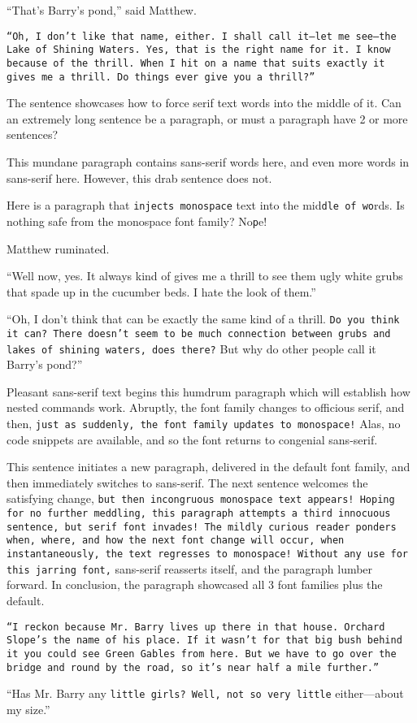 \documentclass[a4paper]{article}
\begin{document}
\textsf{``That's Barry's pond,'' said Matthew.}

\texttt{``Oh, I don't like that name, either. I shall call it---let me see---the Lake of Shining Waters. Yes, that is the right name for it. I know because of the thrill. When I hit on a name that suits exactly it gives me a thrill. Do things ever give you a thrill?''}

The sentence showcases \textrm{how to force serif text words} into the middle of it. Can an extremely long sentence be a paragraph, or must a paragraph have 2 or more sentences?

This mundane paragraph contains \textsf{sans-serif} words here, and even more \textsf{words in sans-serif here}. However, this drab sentence does not.

Here is a paragraph that \texttt{injects monospace} text into the mid\texttt{dle of wo}rds. Is nothing safe from the monospace font family? No\texttt{p}e!

Mat\textrm{thew rumin}ated.

``Well now, yes. \textsf{It always kind of gives me a thrill to see them ugly white grubs that spade up in the cucumber beds.} I hate the look of them.''

``Oh, I don't think that can be exactly the same kind of a thrill. \texttt{Do you think it can? There doesn't seem to be much connection between grubs and lakes of shining waters, does there?} But why do other people call it Barry's pond?''

\textsf{Pleasant sans-serif text begins this humdrum paragraph which will establish how nested commands work. \textrm{Abruptly, the font family changes to officious serif,} and then, \texttt{just as suddenly, the font family updates to monospace!} Alas, no code snippets are available, and so the font returns to congenial sans-serif.}

This sentence initiates a new paragraph, delivered in the default font family, \textsf{and then immediately switches to sans-serif. The next sentence welcomes the satisfying change, \texttt{but then incongruous monospace text appears! Hoping for no further meddling, this paragraph attempts a third innocuous sentence, \textrm{but serif font invades! The mildly curious reader ponders when, where, and how the next font change will occur,} when instantaneously, the text regresses to monospace! Without any use for this jarring font,} sans-serif reasserts itself, and the paragraph lumber forward. In conclusion, the paragraph showcased all 3 font families} plus the default.

\texttt{``I reckon because Mr. Barry lives up there in that house. \textrm{Orchard Slope's the name of his place. }\textsf{If it wasn't for that big bush behind it you could see Green Gables from here.} But we have to go over the bridge and round by the road, so it's near half a mile further.''}

``Has \textsf{Mr. Barry any \texttt{little girls? Well, \textrm{not so} very little} either---about my} size.''
\end{document}
